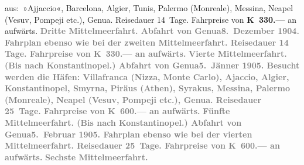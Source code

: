 \begin{ledgroupsized}[t]{13cm}
{{{{{                        aus: »Ajjaccio«}}}\label{T_L01495_1h}, Barcelona, Algier, Tunis, Palermo (Monreale), Messina, Neapel (Vesuv, Pompeji etc.), Genua. Reisedauer 14 Tage. Fahrpreise von \textbf{K 330.—} an aufwärts.}}\pend
           \pstart
           \textcolor{gray}{\textbf{\textbf{Dritte Mittelmeerfahrt.}
                  Abfahrt von Genua\textbf{8. Dezember 1904}. Fahrplan ebenso wie bei der zweiten Mittelmeerfahrt. Reisedauer 14 Tage. Fahrpreise von \textbf{K 330.—} an aufwärts.}}\pend
           \pstart
           \textcolor{gray}{\textbf{\textbf{Vierte Mittelmeerfahrt.}
                  (Bis nach Konstantinopel.) Abfahrt von Genua\textbf{5. Jänner 1905}. Besucht werden die Häfen: Villafranca
                     (Nizza, Monte
                     Carlo), Ajaccio, Algier, Konstantinopel, Smyrna, Piräus (Athen), Syrakus, Messina, Palermo (Monreale), Neapel (Vesuv, Pompeji etc.), Genua. Reisedauer 25 Tage. Fahrpreise von \textbf{K 600.—} an aufwärts.}}\pend
           \pstart
           \textcolor{gray}{\textbf{\textbf{Fünfte Mittelmeerfahrt.}
                  (Bis nach Konstantinopel.) Abfahrt von Genua\textbf{5. Februar 1905}. Fahrplan ebenso wie bei der vierten Mittelmeerfahrt. Reisedauer 25 Tage. Fahrpreise von \textbf{K 600.—} an aufwärts.}}\pend
           \pstart
           \textcolor{gray}{\textbf{\textbf{Sechste Mittelmeerfahrt.}
}}
\end{ledgroupsized}

